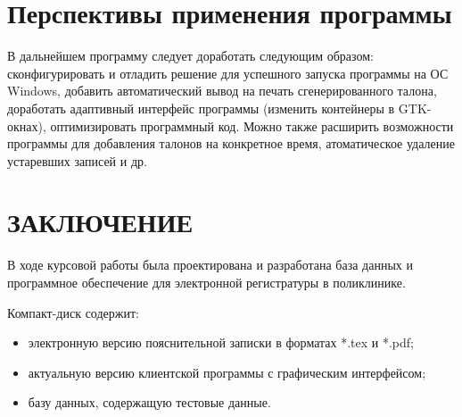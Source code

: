 \clearpage
\section{Перспективы применения программы}
\setcounter{figure}{0}
В дальнейшем программу следует доработать следующим образом:
сконфигурировать и отладить решение для успешного запуска программы на ОС Windows, добавить автоматический вывод на печать сгенерированного талона, доработать адаптивный интерфейс программы (изменить контейнеры в GTK-окнах), оптимизировать программный код. Можно также расширить возможности программы для добавления талонов на конкретное время, атоматическое удаление устаревших записей и др.

\clearpage
\section*{ЗАКЛЮЧЕНИЕ}
В ходе курсовой работы была проектирована и разработана база данных и программное обеспечение для электронной регистратуры в поликлинике.

\clearpage
\renewcommand{\refname}{Список использованных источников}


Компакт-диск содержит: 
\begin{itemize}
\item электронную версию пояснительной записки в форматах *.tex и *.pdf;
\item актуальную версию клиентской программы с графическим интерфейсом;
\item базу данных, содержащую тестовые данные.
\end{itemize}


